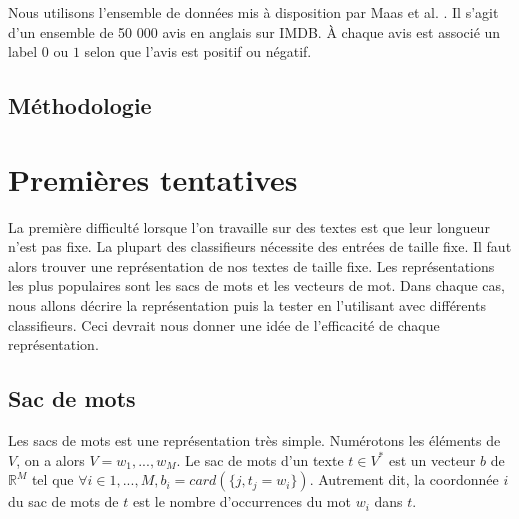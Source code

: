 \documentclass{article}
\begin{document}

Nous utilisons l'ensemble de données mis à disposition par Maas et al. \cite{maas-EtAl:2011:ACL-HLT2011}. Il s'agit d'un ensemble de 50 000 avis en anglais sur IMDB. À chaque avis est associé un label $0$ ou $1$ selon que l'avis est positif ou négatif.



\subsection{Méthodologie}


\section{Premières tentatives}

La première difficulté lorsque l'on travaille sur des textes est que leur longueur n'est pas fixe. La plupart des classifieurs nécessite des entrées de taille fixe. Il faut alors trouver une représentation de nos textes de taille fixe. Les représentations les plus populaires sont les sacs de mots et les vecteurs de mot. Dans chaque cas, nous allons décrire la représentation puis la tester en l'utilisant avec différents classifieurs. Ceci devrait nous donner une idée de l'efficacité de chaque représentation.

\subsection{Sac de mots}


Les sacs de mots est une représentation très simple. Numérotons les éléments de $V$, on a alors $V={w_{1}, ..., w_{M}}$. Le sac de mots d'un texte $t \in V^{*}$ est un vecteur $b$ de $\mathbb{R}^{M}$ tel que $\forall i \in {1, ..., M}, b_{i} = card(\{j, t_{j}=w_{i}\})$. Autrement dit, la coordonnée $i$ du sac de mots de $t$ est le nombre d’occurrences du mot $w_{i}$ dans $t$.



\end{document}
